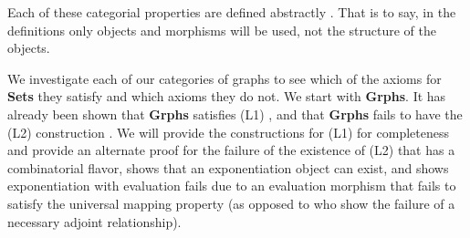 \documentclass[11pt]{article}
\begin{document}
Each of these categorial properties are defined abstractly \cite{Goldblatt}. That is to say, in the definitions only objects and morphisms will be used, not the structure of the objects.\par
We investigate each of our categories of graphs to see which of the axioms for \textbf{Sets} they satisfy and which axioms they do not. We start with \textbf{Grphs}. It has already been shown that \textbf{Grphs} satisfies (L1) \cite{KKWil}, and that \textbf{Grphs} fails to have the (L2) construction \cite{BMS}. We will provide the constructions for (L1) for completeness and provide an alternate proof for the failure of the existence of (L2) that has a combinatorial flavor, shows that an exponentiation object can exist, and shows exponentiation with evaluation fails due to an evaluation morphism that fails to satisfy the universal mapping property (as opposed to \cite{BMS} who show the failure of a necessary adjoint relationship).\par
\end{document}
